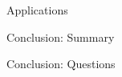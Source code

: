 \documentclass[pdf]{beamer}
\begin{document}
    \begin{frame}{Applications}

    \end{frame}

    \begin{frame}{Conclusion: Summary}

    \end{frame}

    \begin{frame}{Conclusion: Questions}

    \end{frame}
\end{document}

